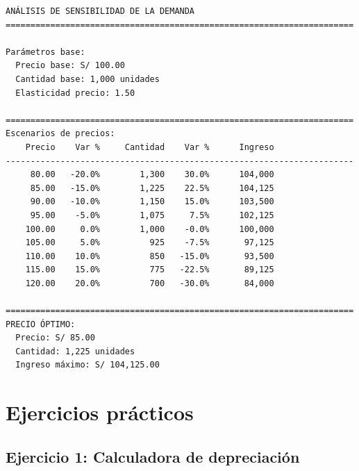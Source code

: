\documentclass[
  doc,
  floatsintext,
  longtable,
  a4paper,
  nolmodern,
  notxfonts,
  notimes,
  12pt,
  colorlinks=true,linkcolor=blue,citecolor=blue,urlcolor=blue]{apa7}
\begin{document}
\begin{verbatim}
ANÁLISIS DE SENSIBILIDAD DE LA DEMANDA
======================================================================

Parámetros base:
  Precio base: S/ 100.00
  Cantidad base: 1,000 unidades
  Elasticidad precio: 1.50

======================================================================
Escenarios de precios:
    Precio    Var %     Cantidad    Var %      Ingreso
----------------------------------------------------------------------
     80.00   -20.0%        1,300    30.0%      104,000
     85.00   -15.0%        1,225    22.5%      104,125
     90.00   -10.0%        1,150    15.0%      103,500
     95.00    -5.0%        1,075     7.5%      102,125
    100.00     0.0%        1,000    -0.0%      100,000
    105.00     5.0%          925    -7.5%       97,125
    110.00    10.0%          850   -15.0%       93,500
    115.00    15.0%          775   -22.5%       89,125
    120.00    20.0%          700   -30.0%       84,000

======================================================================
PRECIO ÓPTIMO:
  Precio: S/ 85.00
  Cantidad: 1,225 unidades
  Ingreso máximo: S/ 104,125.00
\end{verbatim}

\section{Ejercicios prácticos}\label{ejercicios-pruxe1cticos}

\subsection{Ejercicio 1: Calculadora de
depreciación}\label{ejercicio-1-calculadora-de-depreciaciuxf3n}
\end{document}
